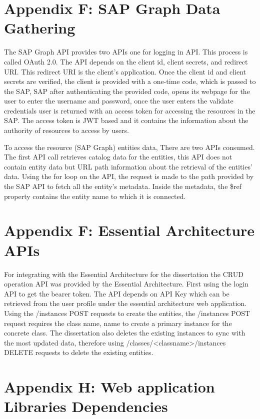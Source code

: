 \documentclass{article}
\begin{document}
\newpage

\section{Appendix F: SAP Graph Data Gathering}
The SAP Graph API provides two APIs one for logging in API. This process is called OAuth 2.0. The API depends on the client id, client secrets, and redirect URI. This redirect URI is the client's application. Once the client id and client secrets are verified, the client is provided with a one-time code, which is passed to the SAP, SAP after authenticating the provided code, opens its webpage for the user to enter the username and password, once the user enters the validate credentials user is returned with an access token for accessing the resources in the SAP. The access token is JWT based and it contains the information about the authority of resources to access by users. 

To access the resource (SAP Graph) entities data, There are two APIs consumed. The first API call retrieves catalog data for the entities, this API does not contain entity data but URL path information about the retrieval of the entities' data. Using the for loop on the API, the request is made to the path provided by the SAP API to fetch all the entity's metadata. Inside the metadata, the \$ref property contains the entity name to which it is connected. 

\section{Appendix F: Essential Architecture APIs}
For integrating with the Essential Architecture for the dissertation the CRUD operation API was provided by the Essential Architecture. First using the login API to get the bearer token. The API depends on API Key which can be retrieved from the user profile under the essential architecture web application. Using the /instances POST requests to create the entities, the /instances POST request requires the class name, name to create a primary instance for the concrete class. The dissertation also deletes the existing instances to sync with the most updated data, therefore using /classes/<classname>/instances DELETE requests to delete the existing entities.

\section{Appendix H: Web application Libraries Dependencies}
\end{document}
